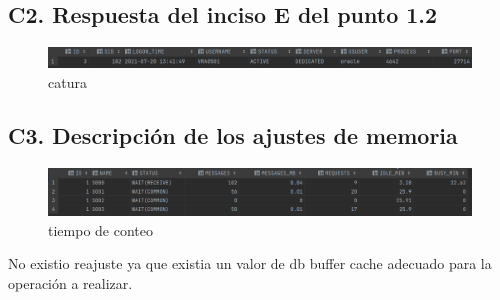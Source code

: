 \documentclass[journal]{IEEEtran}
\begin{document}
\subsection{C2. Respuesta del inciso E del punto 1.2}
\begin{figure}[H]
  \centering
  \includegraphics[scale=.50]{captura_1.png}
   \caption{catura}
   \label{fig:validador_1}
\end{figure}
\subsection{C3. Descripción de los ajustes de memoria}
\begin{figure}[H]
  \centering
  \includegraphics[scale=.40]{captura_4.png}
   \caption{tiempo de conteo}
   \label{fig:validador_2}
\end{figure}
No existio reajuste ya que existia un valor de db buffer cache adecuado para la operación a realizar.
\end{document}
